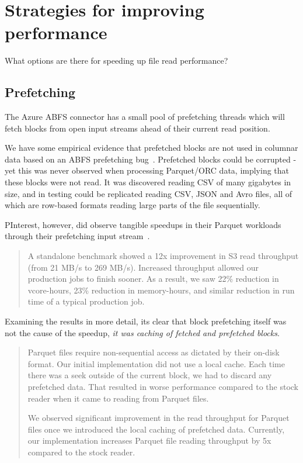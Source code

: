 \documentclass[manuscript]{acmart}
\begin{document}
\section{Strategies for improving performance}\label{sec:strategies-for-improving-performance}

What options are there for speeding up file read performance?

\subsection{Prefetching}\label{subsec:prefetching}

The Azure ABFS connector has a small pool of prefetching threads
which will fetch blocks from open input streams ahead of
their current read position.

We have some empirical evidence that prefetched blocks are not used
in columnar data based on an ABFS prefetching bug\ \cite{HADOOP-18521}.
Prefetched blocks could be corrupted -yet this was never observed when
processing Parquet/ORC data, implying that these blocks were not read.
It was discovered reading CSV of many gigabytes in size, and
in testing could be replicated reading CSV, JSON and Avro files,
all of which are row-based formats reading large parts of the file
sequentially.

PInterest, however, did observe tangible speedups in their Parquet workloads
through their prefetching input stream\ \cite{Bhalchandra:01}.

\begin{quotation}
 A standalone benchmark showed a 12x improvement in S3 read throughput
 (from 21 MB/s to 269 MB/s).
 Increased throughput allowed our production jobs to finish sooner.
 As a result, we saw 22\% reduction in vcore-hours, 23\% reduction in memory-hours,
 and similar reduction in run time of a typical production job.
\end{quotation}

Examining the results in more detail, its clear that block prefetching
itself was not the cause of the speedup, \emph{it was caching of fetched
and prefetched blocks}.

\begin{quotation}
Parquet files require non-sequential access as dictated by their on-disk format.
Our initial implementation did not use a local cache.
Each time there was a seek outside of the current block, we had to discard any prefetched data.
That resulted in worse performance compared to the stock reader when it came to reading from Parquet files.

We observed significant improvement in the read throughput for Parquet files once we
introduced the local caching of prefetched data.
Currently, our implementation increases Parquet file reading throughput by 5x compared to the stock
reader.
\end{quotation}
\end{document}
